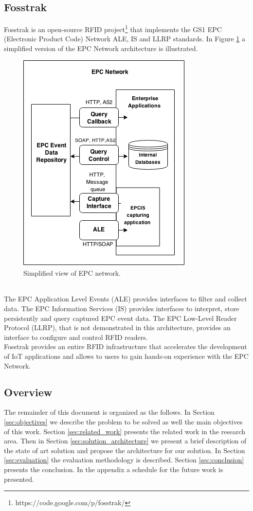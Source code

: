\subsection{Fosstrak}
\label{sub:fosstrak}
Fosstrak is an open-source RFID project\footnote{https://code.google.com/p/fosstrak/}
that implements the GS1 EPC (Electronic Product Code) Network ALE, IS and LLRP standards.
In Figure \ref{fig:epc-architecture} a simplified version of the EPC Network architecture
is illustrated.
\begin{figure}
  \centering
  \includegraphics[scale=.5]{./images/epc-architecture}
  \caption{Simplified view of EPC network.}
  \label{fig:epc-architecture}
\end{figure}\\
The EPC Application Level Events (ALE) provides interfaces to filter and collect data.
The EPC Information Services (IS) provides interfaces to interpret, store persistently
and query captured EPC event data. The EPC Low-Level Reader Protocol (LLRP), that is not
demonstrated in this architecture, provides an interface to configure and control RFID
readers.\\

Fosstrak provides an entire RFID infrastructure that accelerates the development of
IoT applications and allows to users to gain hands-on experience with the EPC Network.
\subsection{Overview}
\label{sub:overview}
The remainder of this document is organized as the follows. In Section \ref{sec:objectives}
we describe the problem to be solved as well the main objectives of this work. Section \ref{sec:related_work}
presents the related work in the research area. Then in Section \ref{sec:solution_architecture}
we present a brief description of the state of art solution and propose the architecture
for our solution. In Section \ref{sec:evaluation} the evaluation methodology is described.
Section \ref{sec:conclusion} presents the conclusion. In the appendix a schedule
for the future work is presented.
